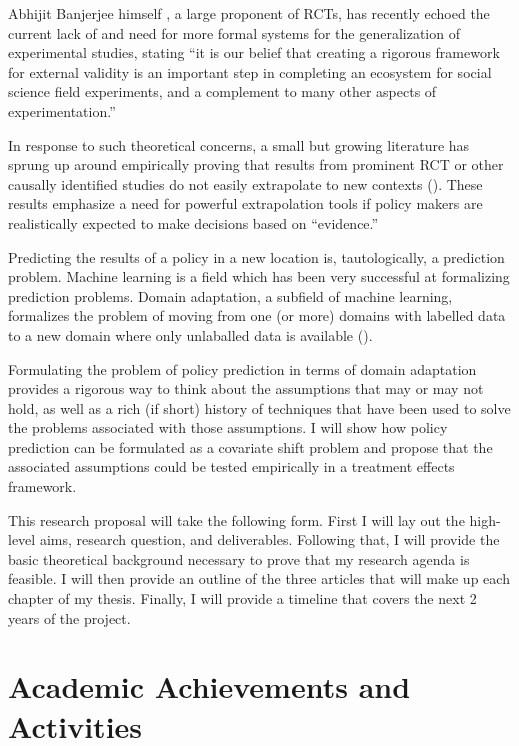 \documentclass[a4paper,12pt]{article}
\begin{document}
Abhijit Banjerjee himself \parencite*{Snowberg2016}, a large proponent of RCTs, has recently echoed the current lack of and need for more formal systems for the generalization of experimental studies, stating ``it is our belief that creating a rigorous framework for external validity is an important step in completing an ecosystem for social science field experiments, and a complement to many other aspects of experimentation.''

In response to such theoretical concerns, a small but growing literature  has sprung up around empirically proving that results from prominent RCT or other causally identified studies do not easily extrapolate to new contexts (\cite{Pritchett2016, Allcott2015, Bisbee2017, Rosenzweig2019}). These results emphasize a need for powerful extrapolation tools if policy makers are realistically expected to make decisions based on ``evidence.''

Predicting the results of a policy in a new location is, tautologically, a prediction problem. Machine learning is a field which has been very successful at formalizing prediction problems. Domain adaptation, a subfield of machine learning, formalizes the problem of moving from one (or more) domains with labelled data to a new domain where only unlaballed data is available (\cite[for a survey, see][]{Pan2010}).

Formulating the problem of policy prediction in terms of domain adaptation provides a rigorous way to think about the assumptions that may or may not hold, as well as a rich (if short) history of techniques that have been used to solve the problems associated with those assumptions. I will show how policy prediction can be formulated as a covariate shift problem and propose that the associated assumptions could be tested empirically in a treatment effects framework.

This research proposal will take the following form. First I will lay out the high-level aims, research question, and deliverables. Following that, I will provide the basic theoretical background necessary to prove that my research agenda is feasible. I will then provide an outline of the three articles that will make up each chapter of my thesis. Finally, I will provide a timeline that covers the next 2 years of the project.

\clearpage

\section { Academic Achievements and Activities }
\end{document}
